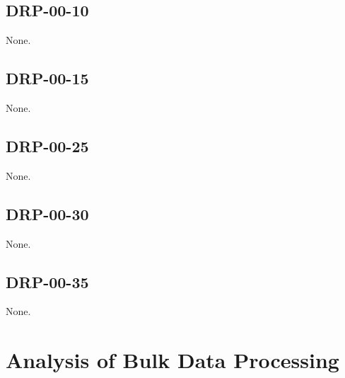 \documentclass[DM,lsstdraft,STR,toc]{lsstdoc}
\begin{document}
\subsection{DRP-00-10}

None.

\subsection{DRP-00-15}

None.

\subsection{DRP-00-25}

None.

\subsection{DRP-00-30}

None.

\subsection{DRP-00-35}

None.

\appendix

\newpage

\section{Analysis of Bulk Data Processing}




\end{document}
